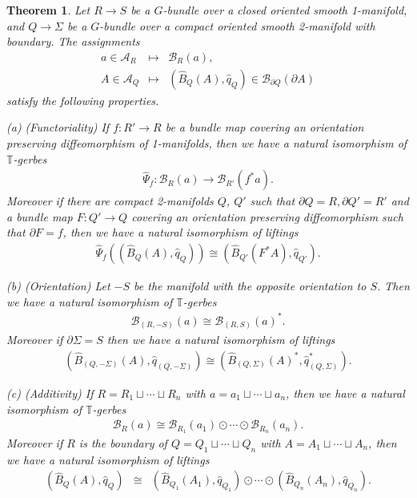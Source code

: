 \documentclass[a4paper,a4paper]{article}
\newtheorem{thm}{Theorem}[section]
\theoremstyle{definition}
\theoremstyle{remark}
\newcommand{\T}{\mathbb{T}}
\newcommand{\A}{\mathcal{A}}
\newcommand{\B}{\mathcal{B}}
\newcommand{\hq}{\widehat{q}}
\def\h#1{ \widehat{#1} }
\begin{document}
\begin{thm} \label{thm_axiom_CSgerbe}
Let $R \to S$ be a $G$-bundle over a closed oriented smooth 1-manifold, and $Q \to \Sigma$ be a $G$-bundle over a compact oriented smooth 2-manifold with boundary. The assignments
\begin{eqnarray*}
a \in \A_R & \longmapsto & \B_R(a), \\
A \in \A_Q & \longmapsto & (\h{B}_Q(A), \hq_Q) \in \B_{\partial Q}(\partial A)
\end{eqnarray*}
satisfy the following properties.

(a) (Functoriality) If $f : R' \to R$ be a bundle map covering an orientation preserving diffeomorphism of 1-manifolds, then we have a natural isomorphism of $\T$-gerbes
\begin{eqnarray}
\h{\Psi}_f : \B_R(a) \rightarrow \B_{R'}(f^*a) .
\label{axiom_CS_a1}
\end{eqnarray}
Moreover if there are compact 2-manifolds $Q$, $Q'$ such that $\partial Q = R, \partial Q' = R'$ and a bundle map $F : Q' \to Q$ covering an orientation preserving diffeomorphism such that $\partial F = f$, then we have a natural isomorphism of liftings
\begin{eqnarray}
\h{\Psi}_f \left( (\h{B}_Q(A), \hq_Q) \right) \cong 
(\h{B}_{Q'}(F^*A), \hq_{Q'}).
\end{eqnarray}

(b) (Orientation) Let $-S$ be the manifold with the opposite orientation to $S$. Then we have a natural isomorphism of $\T$-gerbes
\begin{eqnarray}
\B_{(R, -S)}(a) \cong \B_{(R, S)}(a)^* .
\label{axiom_CS_b1}
\end{eqnarray}
Moreover if $\partial \Sigma = S$ then we have a natural isomorphism of liftings
\begin{eqnarray}
( \h{B}_{(Q, -\Sigma)}(A),  \hq_{(Q, -\Sigma)}  ) \cong 
( \h{B}_{(Q, \Sigma)}(A)^*, \hq_{(Q, \Sigma)}^* ) .
\label{axiom_CS_b2}
\end{eqnarray}

(c) (Additivity) If $R = R_1 \sqcup \cdots \sqcup R_n$ with $a = a_1 \sqcup \cdots \sqcup a_n$, then we have a natural isomorphism of $\T$-gerbes
\begin{eqnarray}
\B_R(a) \cong 
\B_{R_1}(a_1) \odot \cdots \odot \B_{R_n}(a_n). 
\label{axiom_CS_c1}
\end{eqnarray}
Moreover if $R$ is the boundary of $Q = Q_1 \sqcup \cdots \sqcup Q_n$ with $A = A_1 \sqcup \cdots \sqcup A_n$, then we have a natural isomorphism of liftings
\begin{eqnarray}
(\h{B}_Q(A), \hq_Q) 
& \cong &
(\h{B}_{Q_1}(A_1), \hq_{Q_1}) \odot \cdots \odot 
(\h{B}_{Q_n}(A_n), \hq_{Q_n}) .
\label{axiom_CS_c2}
\end{eqnarray}


\end{thm}
\end{document}
